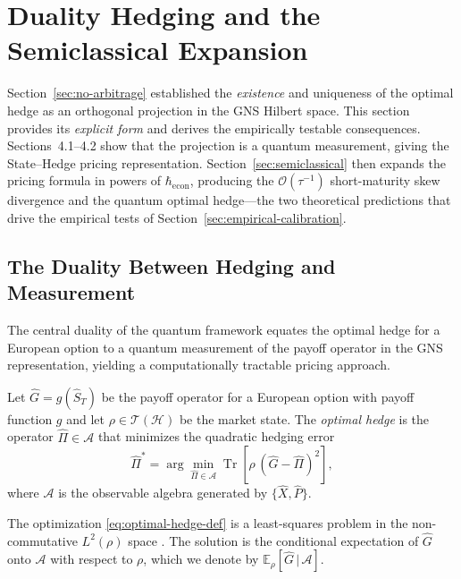 
\section{Duality Hedging and the Semiclassical Expansion}\label{sec:duality-hedging}

Section~\ref{sec:no-arbitrage} established the \emph{existence} and uniqueness
of the optimal hedge as an orthogonal projection in the GNS Hilbert space. This
section provides its \emph{explicit form} and derives the empirically testable
consequences. Sections~4.1--4.2 show that the projection is
a quantum measurement, giving the State--Hedge pricing representation.
Section~\ref{sec:semiclassical} then expands the pricing formula in powers of
$\hbar_{\mathrm{econ}}$, producing the $\mathcal{O}(\tau^{-1})$ short-maturity
skew divergence and the quantum optimal hedge---the two theoretical predictions
that drive the empirical tests of Section~\ref{sec:empirical-calibration}.

\subsection{The Duality Between Hedging and Measurement}

The central duality of the quantum framework equates the optimal hedge for a European
option to a quantum measurement of the payoff operator in the GNS representation,
yielding a computationally tractable pricing approach.

\begin{definition}\label{def:hedging-operator}
Let $\hat{G} = g(\hat{S}_T)$ be the payoff operator for a European option with payoff
function $g$ and let $\rho \in \mathcal{T}(\mathcal{H})$ be the market state. The
\emph{optimal hedge} is the operator $\hat{\Pi} \in \mathcal{A}$ that minimizes the
quadratic hedging error
\begin{equation}\label{eq:optimal-hedge-def}
    \hat{\Pi}^* = \arg\min_{\hat{\Pi} \in \mathcal{A}}
    \operatorname{Tr}\!\left[\rho \, (\hat{G} - \hat{\Pi})^2\right],
\end{equation}
where $\mathcal{A}$ is the observable algebra generated by $\{\hat{X}, \hat{P}\}$.
\end{definition}

The optimization \eqref{eq:optimal-hedge-def} is a least-squares problem in the
non-commutative $L^2(\rho)$ space \citep{pisier2003introduction}. The solution is
the conditional expectation of $\hat{G}$ onto $\mathcal{A}$ with respect to $\rho$,
which we denote by $\mathbb{E}_\rho[\hat{G} \,|\, \mathcal{A}]$.

